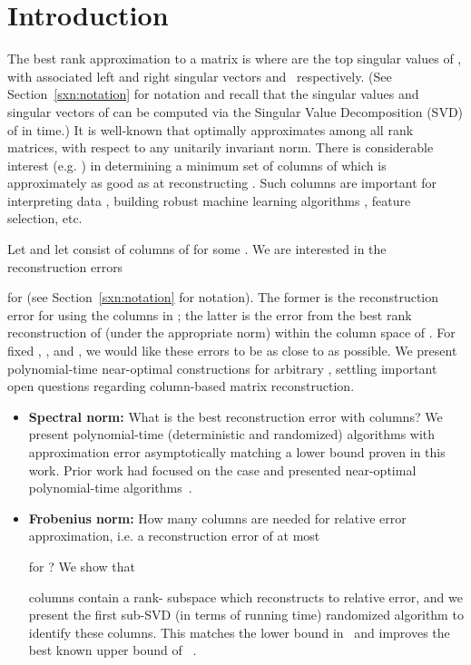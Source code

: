 \section{Introduction}

The best rank  approximation to a matrix
 is
 where
 are the top 
 singular values of , with associated left and right singular vectors
 and~ respectively. (See Section~\ref{sxn:notation} for notation and recall that the singular values and singular vectors of  can be computed via the Singular Value Decomposition (SVD) of  in  time.) It is well-known that  optimally approximates  among all rank  matrices, with respect to any unitarily invariant norm.  There is considerable interest (e.g. \cite{CH92,DR10,DV06,DRVW06,DKR02,FKV98,HMT,LWMRT07,MD09}) in determining a minimum set of  columns of   which is approximately as good as  at reconstructing \math{\matA}.
Such columns are important for interpreting data \cite{MD09}, building robust machine learning algorithms \cite{CH92}, feature selection, etc.

Let  and let  consist of  columns of  for some .
We are interested in the reconstruction errors

for  (see Section~\ref{sxn:notation} for notation).
The former is the reconstruction error
for \math{\matA} using the columns in \math{\matC};
the latter is the error from the
best  rank 
reconstruction of
\math{\matA} (under the appropriate norm) within the column space of .
For fixed , , and , we would like these errors to be as close
to  as possible.
We present polynomial-time near-optimal constructions for arbitrary
,
settling important open questions regarding column-based matrix reconstruction.
\begin{itemize}
\item {\bf Spectral norm:}
What is the best reconstruction error with
 columns? We present polynomial-time (deterministic and
randomized) algorithms with approximation error asymptotically matching a lower
bound proven in this work. Prior work had focused on the  case and presented near-optimal polynomial-time algorithms~\cite{ DR10,GE96}.
\item{\bf Frobenius norm:} How many columns are needed for relative error
approximation, i.e. a reconstruction error of at most

for ? We show that

columns contain a rank- subspace which
reconstructs \math{\matA} to relative error,
and we present the first  sub-SVD (in terms of running time) randomized algorithm to identify these columns. This matches
the  lower bound in~\cite{DV06} and improves the
best known upper bound of ~\cite{DR10,DV06,DMM06b,Sar06}.
\end{itemize}

